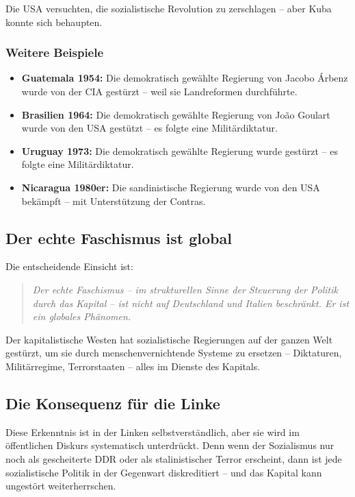Die USA versuchten, die sozialistische Revolution zu zerschlagen – aber Kuba konnte sich behaupten.

\subsubsection{Weitere Beispiele}

\begin{itemize}
    \item \textbf{Guatemala 1954:} Die demokratisch gewählte Regierung von Jacobo Árbenz wurde von der CIA gestürzt – weil sie Landreformen durchführte.
    \item \textbf{Brasilien 1964:} Die demokratisch gewählte Regierung von João Goulart wurde von den USA gestützt – es folgte eine Militärdiktatur.
    \item \textbf{Uruguay 1973:} Die demokratisch gewählte Regierung wurde gestürzt – es folgte eine Militärdiktatur.
    \item \textbf{Nicaragua 1980er:} Die sandinistische Regierung wurde von den USA bekämpft – mit Unterstützung der Contras.
\end{itemize}

\subsection{Der echte Faschismus ist global}

Die entscheidende Einsicht ist:

\begin{quote}
\emph{Der echte Faschismus – im strukturellen Sinne der Steuerung der Politik durch das Kapital – ist nicht auf Deutschland und Italien beschränkt. Er ist ein globales Phänomen.}
\end{quote}

Der kapitalistische Westen hat sozialistische Regierungen auf der ganzen Welt gestürzt, um sie durch menschenvernichtende Systeme zu ersetzen – Diktaturen, Militärregime, Terrorstaaten – alles im Dienste des Kapitals.

\subsection{Die Konsequenz für die Linke}

Diese Erkenntnis ist in der Linken selbstverständlich, aber sie wird im öffentlichen Diskurs systematisch unterdrückt. Denn wenn der Sozialismus nur noch als gescheiterte DDR oder als stalinistischer Terror erscheint, dann ist jede sozialistische Politik in der Gegenwart diskreditiert – und das Kapital kann ungestört weiterherrschen.

